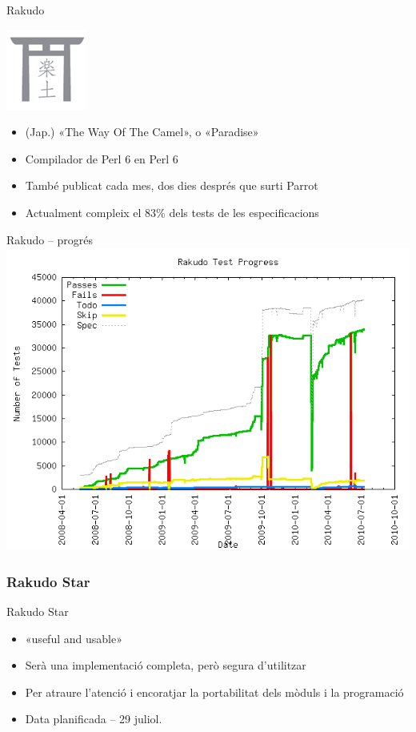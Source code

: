 \documentclass{beamer}
\begin{document}
\begin{frame}{Rakudo}
	\begin{center}
		\includegraphics[scale=0.5]{rakudo}
	\end{center}
	\begin{itemize}
		\item (Jap.) «The Way Of The Camel», o «Paradise»
		\item Compilador de Perl 6 en Perl 6
		\item També publicat cada mes, dos dies després que surti Parrot
		\item Actualment compleix el 83\% dels tests de les especificacions
	\end{itemize}
\end{frame}

\begin{frame}{Rakudo -- progrés}
	\includegraphics[scale=0.3785]{progress}
\end{frame}

			\subsubsection{Rakudo Star}

\begin{frame}{Rakudo Star}
	\begin{itemize}
		\item «useful and usable»
		\item Serà una implementació completa, però segura d'utilitzar
		\item Per atraure l'atenció i encoratjar la portabilitat dels mòduls i la programació
		\item Data planificada -- 29 juliol.
	\end{itemize}
\end{frame}
\end{document}
